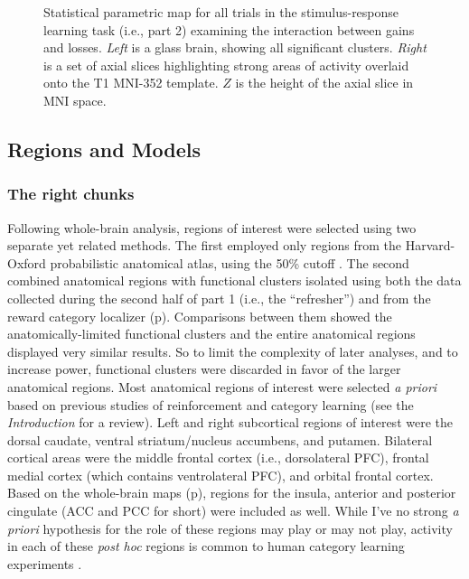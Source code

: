 \begin{figure}[tp]
    \centering
    \caption{Statistical parametric map for all trials in the stimulus-response learning task (i.e., part 2) examining the interaction between gains and losses.  \emph{Left} is a glass brain, showing all significant clusters.  \emph{Right} is a set of axial slices highlighting strong areas of activity overlaid onto the T1 MNI-352 template.  $Z$ is the height of the axial slice in MNI space.}
    \label{fig:gxl}
\end{figure}

\subsection{Regions and Models}
\label{sub:regoins}
\subsubsection{The right chunks}
\label{subsub:chunks}
Following whole-brain analysis, regions of interest were selected using two separate yet related methods.  The first employed only regions from the Harvard-Oxford probabilistic anatomical atlas, using the 50\% cutoff \cite{Desikan:2006p9370}.  The second combined anatomical regions with functional clusters isolated using both the data collected during the second half of part 1 (i.e., the ``refresher'') and from the reward category localizer (p\pageref{subsub:datadetails}).  Comparisons between them showed the anatomically-limited functional clusters and the entire anatomical regions displayed very similar results.  So to limit the complexity of later analyses, and to increase power, functional clusters were discarded in favor of the larger anatomical regions.  Most anatomical regions of interest were selected \emph{a priori} based on previous studies of reinforcement and category learning (see the \emph{Introduction} for a review).  Left and right subcortical regions of interest were the dorsal caudate, ventral striatum/nucleus accumbens, and putamen.   Bilateral cortical areas were the middle frontal cortex (i.e., dorsolateral PFC), frontal medial cortex (which contains ventrolateral PFC), and orbital frontal cortex.  Based on the whole-brain maps (p\pageref{sub:blob}), regions for the insula, anterior and posterior cingulate (ACC and PCC for short) were included as well. While I've no strong \emph{a priori} hypothesis for the role of these regions may play or may not play, activity in each of these \emph{post hoc} regions is common to human category learning experiments \cite{LopezPaniagua:2011p8296,Seger:2010p7188,Cincotta:2007p6672,Seger:2006p5447,Seger:2005pd}.


